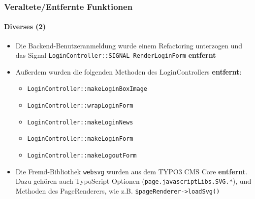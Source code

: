 
\begin{frame}[fragile]
	\frametitle{Veraltete/Entfernte Funktionen}
	\framesubtitle{Diverses (2)}

	\begin{itemize}

		\item Die Backend-Benutzeranmeldung wurde einem Refactoring unterzogen und  das Signal
			\small\texttt{LoginController::SIGNAL\_RenderLoginForm}\normalsize\space
			\textbf{entfernt}

		\item Außerdem wurden die folgenden Methoden des LoginControllers \textbf{entfernt}:

			\begin{itemize}
				\item \texttt{LoginController::makeLoginBoxImage}
				\item \texttt{LoginController::wrapLoginForm}
				\item \texttt{LoginController::makeLoginNews}
				\item \texttt{LoginController::makeLoginForm}
				\item \texttt{LoginController::makeLogoutForm}
			\end{itemize}

		\item Die Fremd-Bibliothek \texttt{websvg} wurden aus dem TYPO3 CMS Core \textbf{entfernt}.
			Dazu gehören auch TypoScript Optionen (\texttt{page.javascriptLibs.SVG.*}),
			und Methoden des PageRenderers, wie z.B. \texttt{\$pageRenderer->loadSvg()}

	\end{itemize}

\end{frame}


